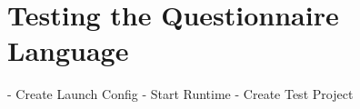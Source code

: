 \section{Testing the Questionnaire Language}

- Create Launch Config
- Start Runtime
- Create Test Project
